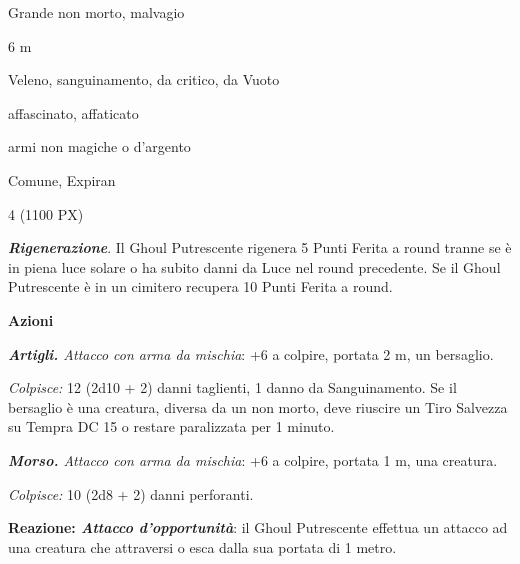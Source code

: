 \begin{multicols}{2}
{
\begin{description}[noitemsep, topsep=0pt, parsep=0pt, partopsep=0pt, itemsep=1pt, leftmargin=2.35cm,  labelwidth=2.2cm, itemindent=0cm, listparindent=0pt] %
\setlength{\baselineskip}{10pt}
\item[\textbf{Taglia/Tipo}] Grande non morto, malvagio
\item[\textbf{Caratt.}] 
\item[\textbf{Punti Ferita}] 
\item[\textbf{Movimento}] 6 m
\item[\textbf{Tiri Salvez.}] 
\item[\textbf{Imm. Danni}] Veleno, sanguinamento, da critico, da Vuoto
\item[\textbf{Immunità}] affascinato, affaticato
\item[\textbf{Res. Danni}] armi non magiche o d'argento
\item[\textbf{Sensi}] 
\item[\textbf{Linguaggi}] Comune, Expiran
\item[\textbf{Sfida}] 4 (1100 PX)
\end{description}
\smallskip

\textbf{\emph{Rigenerazione}}. Il Ghoul Putrescente rigenera 5 Punti Ferita a round tranne se è in piena luce solare o ha subito danni da Luce nel round precedente. Se il Ghoul Putrescente è in un cimitero recupera 10 Punti Ferita a round.

\textbf{Azioni}

\emph{\textbf{Artigli.} Attacco con arma da mischia}: +6 a colpire, portata 2 m, un bersaglio.

\emph{Colpisce:} 12 (2d10 + 2) danni taglienti, 1 danno da Sanguinamento. Se il bersaglio è una creatura, diversa da un non morto, deve riuscire un Tiro Salvezza su Tempra DC 15 o restare paralizzata per 1 minuto.

\emph{\textbf{Morso.} Attacco con arma da mischia}: +6 a colpire, portata 1 m, una creatura.

\emph{Colpisce:} 10 (2d8 + 2) danni perforanti.

\textbf{Reazione: \emph{Attacco d'opportunità}}: il Ghoul Putrescente effettua un attacco ad una creatura che attraversi o esca dalla sua portata di 1 metro.

}
\end{multicols}
